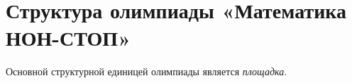 \documentclass[a4paper,12pt]{article}
\begin{document}
\section{Структура олимпиады «Математика НОН-СТОП»}

Основной структурной единицей олимпиады является {\itshape площадка}.
\end{document}
